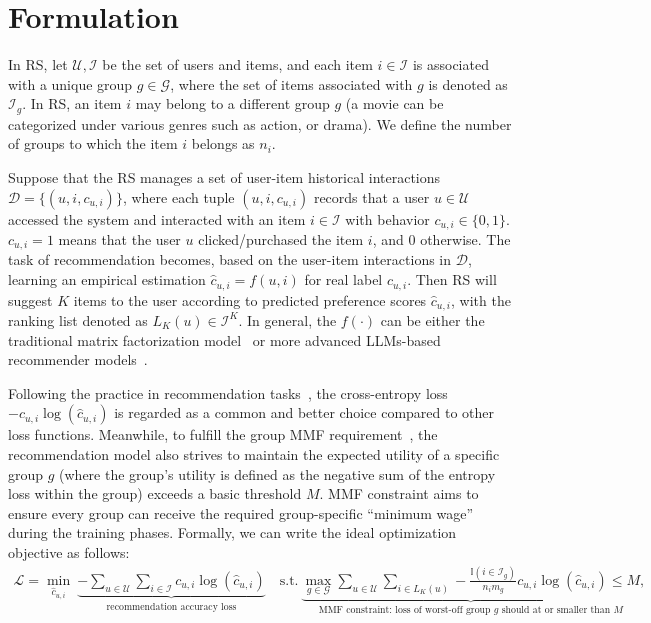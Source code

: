 \section{Formulation}

In RS, let $\mathcal{U}, \mathcal{I}$ be the set of users and items, and each item $i\in \mathcal{I}$ is associated with a unique group $g\in \mathcal{G}$, where the set of items associated with $g$ is denoted as $\mathcal{I}_g$. In RS, an item $i$ may belong to a different group $g$ (\eg a movie can be categorized under various genres such as action, or drama). We define the number of groups to which the item $i$ belongs as $n_i$.


Suppose that the RS manages a set of user-item historical interactions $\mathcal{D} = \{(u,i, 
c_{u,i})\}$, where each tuple $(u, i, c_{u,i})$ records that a user $u\in\mathcal{U}$ accessed the system and interacted with an item $i\in\mathcal{I}$ with behavior $c_{u,i}\in\{0,1\}$. $c_{u,i} = 1$ means that the user $u$ clicked/purchased the item $i$, and 0 otherwise. The task of recommendation becomes, based on the user-item interactions in $\mathcal{D}$, learning an empirical estimation $\hat{c}_{u,i} = f(u, i)$ for real label $c_{u,i}$. Then RS will suggest $K$ items to the user according to predicted preference scores $\hat{c}_{u,i}$, with the ranking list denoted as $L_K(u) \in \mathcal{I}^{K}$. In general, the $f(\cdot)$ can be either the traditional matrix factorization model~\citep{he2016fast} or more advanced LLMs-based recommender models~\citep{bao2023bi}.

Following the practice in recommendation tasks~\citep{he2017neural, he2016fast}, the cross-entropy loss $-c_{u,i}\log (\hat{c}_{u,i})$ is regarded as a common and better choice compared to other loss functions. Meanwhile, to fulfill the group MMF requirement~\citep{fairrec, xu2024fairsync}, the recommendation model also strives to maintain the expected utility of a specific group 
$g$ (where the group's utility is defined as the negative sum of the entropy loss within the group) exceeds a basic threshold $M$. MMF constraint aims to ensure every group can receive the required group-specific ``minimum wage'' during the training phases. Formally, we can write the ideal optimization objective as follows:
\begin{equation}
\label{eq:obj}
    \begin{aligned}
        \mathcal{L} = \min_{\hat{c}_{u,i}} ~ \underbrace{-\sum_{u\in\mathcal{U}}\sum_{i\in \mathcal{I}} c_{u,i}\log (\hat{c}_{u,i})}_{\text{recommendation accuracy loss}}\quad \textrm{s.t.}~ \underbrace{\max_{g\in\mathcal{G}}\sum_{u\in\mathcal{U}} \sum_{i\in L_K(u)} -\frac{\mathbb{I}(i\in \mathcal{I}_g)}{n_i m_g}c_{u,i}\log(\hat{c}_{u,i}) \leq M}_{\text{MMF constraint: loss of worst-off group $g$ should at or smaller than $M$}}, \\
    \end{aligned}
\end{equation}

